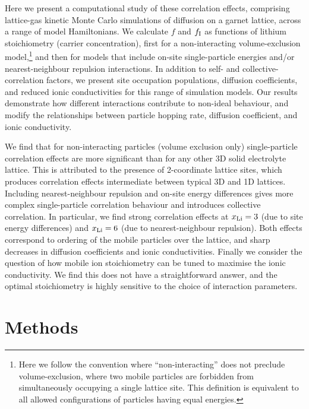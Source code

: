 \documentclass[aps,prb,twocolumn,superscriptaddress,reprint]{revtex4-1}
\newcommand{\xLi}{x_\m{Li}}
\begin{document}
Here we present a computational study of these correlation effects, comprising lattice-gas kinetic Monte Carlo simulations of diffusion on a garnet lattice, across a range of model Hamiltonians. 
We calculate $f$ and $f_{\mathrm{I}}$ as functions of lithium stoichiometry (carrier concentration), first for a non-interacting volume-exclusion model,\footnote{Here we follow the convention where ``non-interacting'' does not preclude volume-exclusion, where two mobile particles are forbidden from simultaneously occupying a single lattice site.\cite{Kutner_PhysLett1981} This definition is equivalent to all allowed configurations of particles having equal energies.} and then for models that include on-site single-particle energies and/or nearest-neighbour repulsion interactions. 
In addition to self- and collective-correlation factors, we present site occupation populations, diffusion coefficients, and reduced ionic conductivities for this range of simulation models. Our results demonstrate how different interactions contribute to non-ideal behaviour, and modify the relationships between particle hopping rate, diffusion coefficient, and ionic conductivity. 

We find that for non-interacting particles (volume exclusion only) single-particle correlation effects are more significant than for any other 3D solid electrolyte lattice. This is attributed to the presence of 2-coordinate lattice sites, which produces correlation effects intermediate between typical 3D and 1D lattices. Including nearest-neighbour repulsion and on-site energy differences gives more complex single-particle correlation behaviour and introduces collective correlation. In particular, we find strong correlation effects at $\xLi=3$ (due to site energy differences) and $\xLi=6$ (due to nearest-neighbour repulsion). Both effects correspond to ordering of the mobile particles over the lattice, and sharp decreases in diffusion coefficients and ionic conductivities. Finally we consider the question of how mobile ion stoichiometry can be tuned to maximise the ionic conductivity. We find this does not have a straightforward answer, and the optimal stoichiometry is highly sensitive to the choice of interaction parameters.

\section{Methods}
\end{document}
